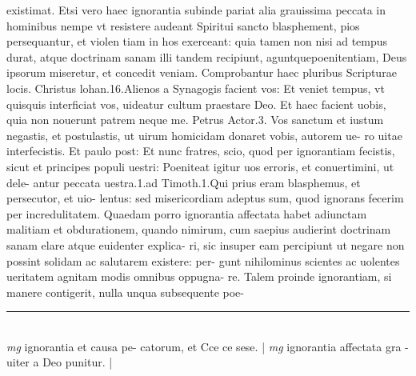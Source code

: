 \documentclass{article}
\begin{document}
\begin{pages}
existimat. Etsi vero haec ignorantia subinde pariat alia grauissima peccata in hominibus  nempe vt resistere audeant Spiritui sancto blasphement, pios persequantur, et violen tiam in hos exerceant: quia tamen non nisi ad tempus durat, atque  doctrinam sanam illi tandem recipiunt, aguntquepoenitentiam, Deus ipsorum miseretur, et concedit veniam. Comprobantur haec pluribus Scripturae locis. Christus lohan.16.Alienos a Synagogis facient vos: Et veniet tempus, vt quisquis interficiat vos, uideatur cultum praestare Deo. Et haec facient uobis, quia non nouerunt patrem neque  me. Petrus Actor.3. Vos sanctum et iustum negastis, et postulastis, ut uirum homicidam donaret vobis, autorem ue- ro uitae interfecistis. Et paulo post: Et nunc fratres, scio, quod per ignorantiam fecistis, sicut et principes populi uestri: Poeniteat igitur uos erroris, et conuertimini, ut dele- antur peccata uestra.1.ad Timoth.1.Qui prius eram blasphemus, et persecutor, et uio- lentus: sed misericordiam adeptus sum, quod ignorans fecerim per incredulitatem.  \pend\pstart Quaedam porro ignorantia affectata habet adiunctam malitiam et obdurationem, quando nimirum, cum saepius audierint doctrinam sanam elare atque  euidenter explica- ri, sic insuper eam percipiunt ut negare non possint solidam ac salutarem existere: per- gunt nihilominus scientes ac uolentes ueritatem agnitam modis omnibus oppugna- re. Talem proinde ignorantiam, si manere contigerit, nulla unqua subsequente poe-  \pend
\vspace{0.5cm}\noindent
\vspace{0.2cm}\rule{1cm}{0.2pt}\\ 
\hspace{0.2cm}\textit{mg}
\footnotesize ignorantia et causa pe- catorum, et Cce ce sese. 
\normalsize| 
\hspace{0.2cm}\textit{mg}
\footnotesize ignorantia affectata gra - uiter a Deo punitur. 
\normalsize| 

\end{pages}
\end{document}

